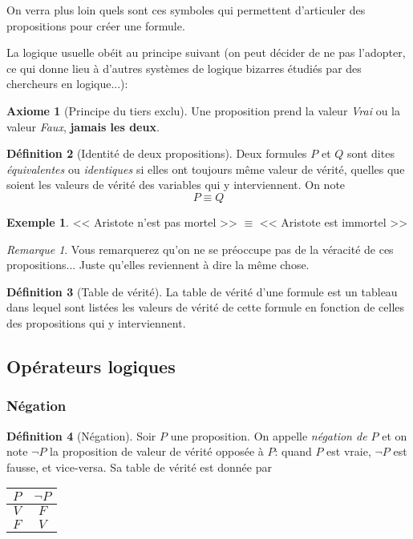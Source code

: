 \documentclass[11pt]{article}
\theoremstyle{definition}
\newtheorem{defn}{Définition}[section]
\newtheorem{axio}[defn]{Axiome}
\newtheorem{exe}{Exemple}
\theoremstyle{remark}
\newtheorem{rem}{Remarque}
\begin{document}
On verra plus loin quels sont ces symboles qui permettent d'articuler des propositions pour créer une formule.



La logique usuelle obéit au principe suivant (on peut décider de ne pas l'adopter, ce qui donne lieu à d'autres systèmes de logique bizarres étudiés par des chercheurs en logique...):

\begin{axio}[Principe du tiers exclu]
Une proposition prend la valeur \textit{Vrai} ou la valeur \textit{Faux}, \textbf{jamais les deux}.
\end{axio}

\begin{defn}[Identité de deux propositions]
Deux formules $P$ et $Q$ sont dites \textit{équivalentes} ou \textit{identiques} si elles ont toujours même valeur de vérité, quelles que soient les valeurs de vérité des variables qui y interviennent. On note
\[P\equiv Q
\]
\end{defn}

\begin{exe}\leavevmode
<< Aristote n'est pas mortel >> $\equiv$ << Aristote est immortel >>
\end{exe}

\begin{rem}Vous remarquerez qu'on ne se préoccupe pas de la véracité de ces propositions... Juste qu'elles reviennent à dire la même chose.
\end{rem}

\begin{defn}[Table de vérité]
La table de vérité d'une formule est un tableau dans lequel sont listées les valeurs de vérité de cette formule en fonction de celles des propositions qui y interviennent.
\end{defn}






\subsection{Opérateurs logiques}

\subsubsection{Négation}

\begin{defn}[Négation]
Soir $P$ une proposition. On appelle \textit{négation de $P$} et on note $\neg P$ la proposition de valeur de vérité opposée à $P$: quand $P$ est vraie, $\neg P$ est fausse, et vice-versa. Sa table de vérité est donnée par
\begin{center}
  \begin{tabular}{|c|c|}\hline
  $P$ & $\neg P$ \\ \hline
  $V$ & $F$ \\ \hline
  $F$ & $V$ \\ \hline
  \end{tabular}
\end{center}
\end{defn}
\end{document}
